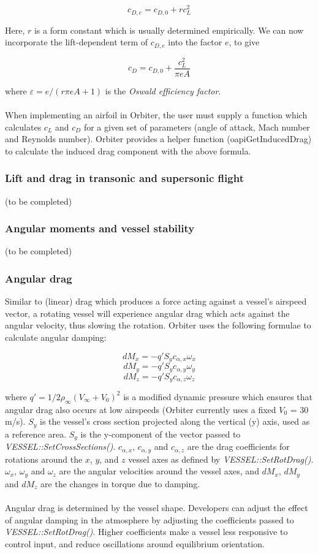 \documentclass[Orbiter Developer Manual.tex]{subfiles}
\begin{document}
\[ c_{D,e} = c_{D,0} + rc_{L}^{2} \]

\noindent
Here, $r$ is a form constant which is usually determined empirically. We can now incorporate the lift-dependent term of $c_{D,e}$ into the factor $e$, to give

\[ c_{D} = c_{D,0} + \frac{c_{L}^{2}}{\pi eA} \]

\noindent
where $\varepsilon = e / (r \pi eA + 1)$ is the \textit{Oswald efficiency factor}.\\
\\
When implementing an airfoil in Orbiter, the user must supply a function which calculates $c_{L}$ and $c_{D}$ for a given set of parameters (angle of attack, Mach number and Reynolds number). Orbiter provides a helper function (oapiGetInducedDrag) to calculate the induced drag component with the above formula.


\subsubsection{Lift and drag in transonic and supersonic flight}
(to be completed)


\subsubsection{Angular moments and vessel stability}
(to be completed)


\subsubsection{Angular drag}
Similar to (linear) drag which produces a force acting against a vessel's airspeed vector, a rotating vessel will experience angular drag which acts against the angular velocity, thus slowing the rotation. Orbiter uses the following formulae to calculate angular damping:

\[ dM_{x} = -q'S_{y}c_{\alpha,x}\omega_{x} \]
\[ dM_{y} = -q'S_{y}c_{\alpha,y}\omega_{y} \]
\[ dM_{z} = -q'S_{y}c_{\alpha,z}\omega_{z} \]

\noindent
where $q' = 1/2 \rho_{\infty}(V_{\infty} + V_{0})^{2}$ is a modified dynamic pressure which ensures that angular drag also occurs at low airspeeds (Orbiter currently uses a fixed $V_{0}$ = 30 m/s). $S_{y}$ is the vessel's cross section projected along the vertical (y) axis, used as a reference area. $S_{y}$ is the y-component of the vector passed to \textit{VESSEL::SetCrossSections()}. $c_{\alpha,x}$, $c_{\alpha,y}$ and $c_{\alpha,z}$ are the drag coefficients for rotations around the $x$, $y$, and $z$ vessel axes as defined by \textit{VESSEL::SetRotDrag()}. $\omega_{x}$, $\omega_{y}$ and $\omega_{z}$ are the angular velocities around the vessel axes, and $dM_{x}$, $dM_{y}$ and $dM_{z}$ are the changes in torque due to damping.\\
\\
Angular drag is determined by the vessel shape. Developers can adjust the effect of angular damping in the atmosphere by adjusting the coefficients passed to \textit{VESSEL::SetRotDrag()}. Higher coefficients make a vessel less responsive to control input, and reduce oscillations around equilibrium orientation.
\end{document}
